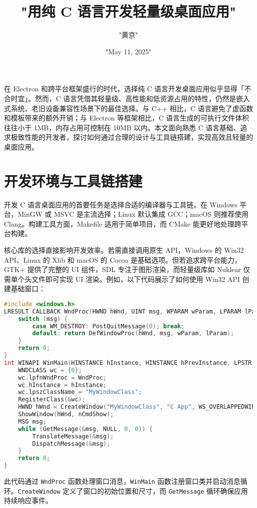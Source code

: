 \title{"用纯 C 语言开发轻量级桌面应用"}
\author{"黄京"}
\date{"May 11, 2025"}
\maketitle
在 Electron 和跨平台框架盛行的时代，选择纯 C 语言开发桌面应用似乎显得「不合时宜」。然而，C 语言凭借其轻量级、高性能和低资源占用的特性，仍然是嵌入式系统、老旧设备兼容性场景下的最佳选择。与 C++ 相比，C 语言避免了虚函数和模板带来的额外开销；与 Electron 等框架相比，C 语言生成的可执行文件体积往往小于 1MB，内存占用可控制在 10MB 以内。本文面向熟悉 C 语言基础、追求极致性能的开发者，探讨如何通过合理的设计与工具链搭建，实现高效且轻量的桌面应用。\par
\chapter{开发环境与工具链搭建}
开发 C 语言桌面应用的首要任务是选择合适的编译器与工具链。在 Windows 平台，MinGW 或 MSVC 是主流选择；Linux 默认集成 GCC；macOS 则推荐使用 Clang。构建工具方面，Makefile 适用于简单项目，而 CMake 能更好地处理跨平台构建。\par
核心库的选择直接影响开发效率。若需直接调用原生 API，Windows 的 Win32 API、Linux 的 Xlib 和 macOS 的 Cocoa 是基础选项。但若追求跨平台能力，GTK+ 提供了完整的 UI 组件，SDL 专注于图形渲染，而轻量级库如 Nuklear 仅需单个头文件即可实现 UI 渲染。例如，以下代码展示了如何使用 Win32 API 创建基础窗口：\par
\begin{lstlisting}[language=c]
#include <windows.h>
LRESULT CALLBACK WndProc(HWND hWnd, UINT msg, WPARAM wParam, LPARAM lParam) {
    switch (msg) {
        case WM_DESTROY: PostQuitMessage(0); break;
        default: return DefWindowProc(hWnd, msg, wParam, lParam);
    }
    return 0;
}
int WINAPI WinMain(HINSTANCE hInstance, HINSTANCE hPrevInstance, LPSTR lpCmdLine, int nCmdShow) {
    WNDCLASS wc = {0};
    wc.lpfnWndProc = WndProc;
    wc.hInstance = hInstance;
    wc.lpszClassName = "MyWindowClass";
    RegisterClass(&wc);
    HWND hWnd = CreateWindow("MyWindowClass", "C App", WS_OVERLAPPEDWINDOW, 100, 100, 800, 600, NULL, NULL, hInstance, NULL);
    ShowWindow(hWnd, nCmdShow);
    MSG msg;
    while (GetMessage(&msg, NULL, 0, 0)) {
        TranslateMessage(&msg);
        DispatchMessage(&msg);
    }
    return 0;
}
\end{lstlisting}
此代码通过 \verb!WndProc! 函数处理窗口消息，\verb!WinMain! 函数注册窗口类并启动消息循环。\verb!CreateWindow! 定义了窗口的初始位置和尺寸，而 \verb!GetMessage! 循环确保应用持续响应事件。\par
